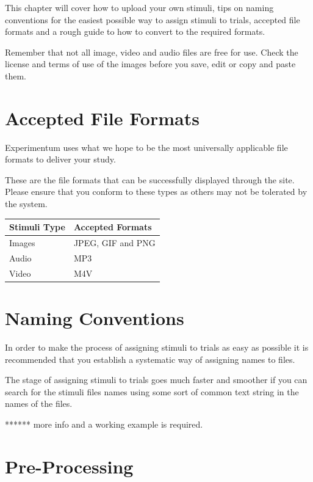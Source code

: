 \documentclass[]{book}
\begin{document}
This chapter will cover how to upload your own stimuli, tips on naming conventions for the easiest possible way to assign stimuli to trials, accepted file formats and a rough guide to how to convert to the required formats.

\begin{warning}
Remember that not all image, video and audio files are free for use.
Check the license and terms of use of the images before you save, edit
or copy and paste them.
\end{warning}

\hypertarget{accepted-file-formats}{%
\section{Accepted File Formats}\label{accepted-file-formats}}

Experimentum uses what we hope to be the most universally applicable file formats to deliver your study.

These are the file formats that can be successfully displayed through the site. Please ensure that you conform to these types as others may not be tolerated by the system.

\begin{tabular}{l|l}
\hline
Stimuli Type & Accepted Formats\\
\hline
Images & JPEG, GIF and PNG\\
\hline
Audio & MP3\\
\hline
Video & M4V\\
\hline
\end{tabular}

\hypertarget{naming-conventions}{%
\section{Naming Conventions}\label{naming-conventions}}

In order to make the process of assigning stimuli to trials as easy as possible it is recommended that you establish a systematic way of assigning names to files.

The stage of assigning stimuli to trials goes much faster and smoother if you can search for the stimuli files names using some sort of common text string in the names of the files.

****** more info and a working example is required.

\hypertarget{pre-processing}{%
\section{Pre-Processing}\label{pre-processing}}
\end{document}
